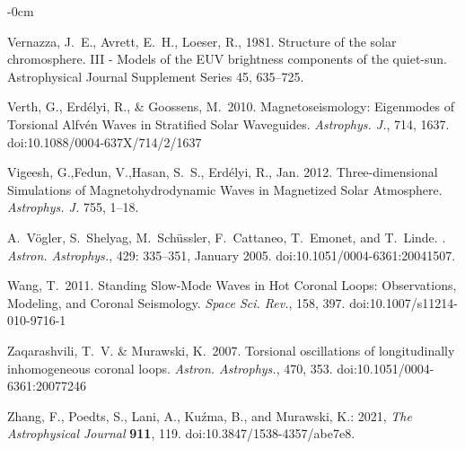 \documentclass[physics,article,submit,pdftex,moreauthors]{Definitions/mdpi}
\newcommand{\aap}{{\it Astron. Astrophys.}}
\newcommand{\aaps}{{\it Astron. Astrophys. Suppl.}}
\newcommand{\apj}{{\it Astrophys. J.}}
\newcommand{\ssr}{{\it Space Sci. Rev.}}
\begin{document}
\begin{adjustwidth}{-\extralength}{0cm}
\begin{thebibliography}{999}
{Vernazza}, J.~E., {Avrett}, E.~H., {Loeser}, R., 1981. {Structure of the solar
  chromosphere. III - Models of the EUV brightness components of the
  quiet-sun}. Astrophysical Journal Supplement Series 45, 635--725.
  
 Verth, G., Erd{\'e}lyi, R., \& Goossens, M.\ 2010. {Magnetoseismology: Eigenmodes of Torsional Alfvén Waves in Stratified Solar Waveguides}. \apj, 714, 1637. doi:10.1088/0004-637X/714/2/1637

{Vigeesh}, G.,{Fedun}, V.,{Hasan}, S.~S., {Erd{\'e}lyi}, R.,  Jan. 2012. {Three-dimensional Simulations of Magnetohydrodynamic Waves in Magnetized Solar Atmosphere}. \apj
  755, 1--18.



A.~{V{\"o}gler}, S.~{Shelyag}, M.~{Sch{\"u}ssler}, F.~{Cattaneo}, T.~{Emonet},
  and T.~{Linde}.
.
\newblock \emph{\aap}, 429: 335--351, January 2005.
\newblock doi:10.1051/0004-6361:20041507.

 Wang, T.\ 2011. {Standing Slow-Mode Waves in Hot Coronal Loops: Observations, Modeling, and Coronal Seismology}. \ssr, 158, 397. doi:10.1007/s11214-010-9716-1

 Zaqarashvili, T.~V. \& Murawski, K.\ 2007. {Torsional oscillations of longitudinally inhomogeneous coronal loops}. \aap, 470, 353. doi:10.1051/0004-6361:20077246


Zhang, F., Poedts, S., Lani, A., Ku{\'z}ma, B., and Murawski, K.: 2021, {\it The Astrophysical Journal} {\bf 911}, 119. doi:10.3847/1538-4357/abe7e8.




\end{thebibliography}
\end{adjustwidth}
\end{document}
